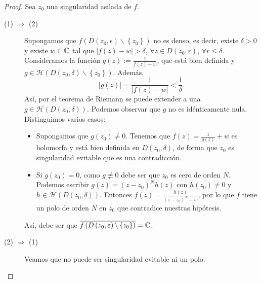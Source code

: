 \begin{proof}
Sea $\displaystyle z_{0} $ una singularidad asilada de $\displaystyle f $. 
\begin{description}
	\item[(1) $\displaystyle \Rightarrow $ (2)] Supongamos que $\displaystyle f\left(D\left(z_{0}, \epsilon \right)\backslash \left\{ z_{0}\right\} \right) $ no es denso, es decir, existe $\displaystyle \delta  > 0 $ y existe $\displaystyle w \in \mathbb{C} $ tal que $\displaystyle \left|f\left(z\right)-w\right|> \delta  $, $\displaystyle \forall z \in D\left(z_{0}, r\right) $, $\displaystyle \forall r \leq \delta  $. 
		Consideramos la función $\displaystyle g\left(z\right):=\frac{1}{f\left(z\right)-w} $, que está bien definida y $\displaystyle g \in \mathcal{H}\left(D\left(z_{0}, \delta \right)\backslash \left\{ z_{0}\right\} \right) $. Además, 
		\[ \left|g\left(z\right)\right| = \frac{1}{ \left|f\left(z\right)-w\right|}<\frac{1}{\delta } .\]
	Así, por el teorema de Riemann se puede extender a una $\displaystyle g \in \mathcal{H}\left(D\left(z_{0}, \delta \right)\right) $. Podemos observar que $\displaystyle g $ no es idénticamente nula. Distinguimos varios casos:
	\begin{itemize}
	\item Supongamos que $\displaystyle g\left(z_{0}\right)\neq 0 $. Tenemos que $\displaystyle f\left(z\right)=\frac{1}{g\left(z\right)}+w $ es holomorfa y está bien definida en $\displaystyle D\left(z_{0}, \delta \right) $, de forma que $\displaystyle z_{0} $ es singularidad evitable que es una contradicción. 
	\item Si $\displaystyle g\left(z_{0}\right)=0 $, como $\displaystyle g\not\equiv 0 $ debe ser que $\displaystyle z_{0} $ es cero de orden $\displaystyle N $. Podemos escribir $\displaystyle g\left(z\right)=\left(z-z_{0}\right)^{N}h\left(z\right) $ con $\displaystyle h\left(z_{0}\right)\neq 0 $ y $\displaystyle h\in \mathcal{H}\left(D\left(z_{0}, \delta \right)\right) $.
		Entonces $\displaystyle f\left(z\right)=\frac{h\left(z\right)}{\left(z-z_{0}\right)^{N}+w} $, por lo que $\displaystyle f $ tiene un polo de orden $\displaystyle N $ en $\displaystyle z_{0} $ que contradice nuestras hipótesis. 
	\end{itemize}
	Así, debe ser que $\displaystyle \overline{f\left(D\left(z_{0}, \varepsilon \right)\backslash \left\{ z_{0}\right\} \right)} = \mathbb{C} $. 
\item[(2) $\displaystyle \Rightarrow $ (1)] Veamos que no puede ser singularidad evitable ni un polo. 
	\begin{itemize}

\end{itemize}
\end{description}
\end{proof}
